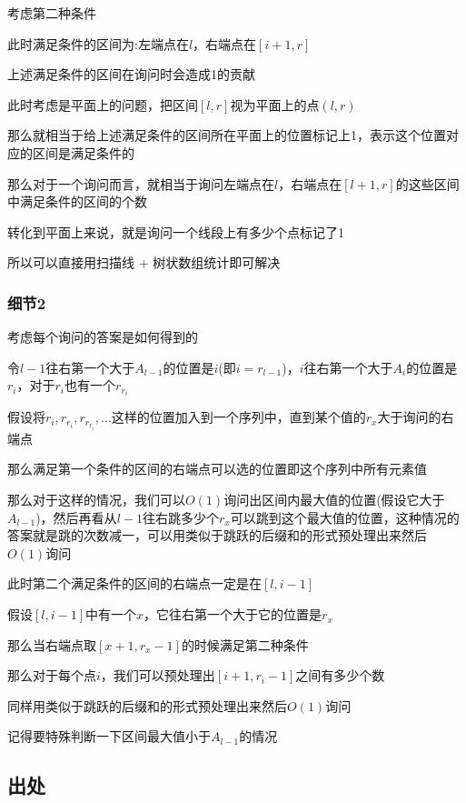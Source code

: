 \documentclass[a4paper]{article}
\begin{document}
			考虑第二种条件
			
			此时满足条件的区间为:左端点在$l$，右端点在$[i + 1, r]$
			
			上述满足条件的区间在询问时会造成1的贡献
			
			此时考虑是平面上的问题，把区间$[l,r]$视为平面上的点$(l,r)$
			
			那么就相当于给上述满足条件的区间所在平面上的位置标记上1，表示这个位置对应的区间是满足条件的
			
			那么对于一个询问而言，就相当于询问左端点在$l$，右端点在$[l + 1,r]$的这些区间中满足条件的区间的个数
			
			转化到平面上来说，就是询问一个线段上有多少个点标记了1
			
			所以可以直接用扫描线 + 树状数组统计即可解决
			
		\subsubsection{细节2}
			
			考虑每个询问的答案是如何得到的
			
			令$l-1$往右第一个大于$A_{l-1}$的位置是$i$(即$i = r_{l-1}$)，$i$往右第一个大于$A_i$的位置是$r_i$，对于$r_i$也有一个$r_{r_i}$
			
			假设将$r_i,r_{r_i},r_{r_{r_i}},...$这样的位置加入到一个序列中，直到某个值的$r_x$大于询问的右端点
			
			那么满足第一个条件的区间的右端点可以选的位置即这个序列中所有元素值
			
			那么对于这样的情况，我们可以$O(1)$询问出区间内最大值的位置(假设它大于$A_{l-1}$)，然后再看从$l-1$往右跳多少个$r_x$可以跳到这个最大值的位置，这种情况的答案就是跳的次数减一，可以用类似于跳跃的后缀和的形式预处理出来然后$O(1)$询问
			
			此时第二个满足条件的区间的右端点一定是在$[l,i-1]$
			
			假设$[l,i-1]$中有一个$x$，它往右第一个大于它的位置是$r_x$
			
			那么当右端点取$[x + 1, r_x - 1]$的时候满足第二种条件
			
			那么对于每个点$i$，我们可以预处理出$[i + 1,r_i - 1]$之间有多少个数
			
			同样用类似于跳跃的后缀和的形式预处理出来然后$O(1)$询问
			
			记得要特殊判断一下区间最大值小于$A_{l-1}$的情况
		
		
	\subsection{出处}
		
\end{document}
